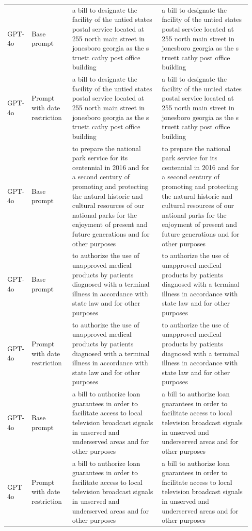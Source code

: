 \begin{longtable}{>{\raggedright\arraybackslash}p{1.4cm}>{\raggedright\arraybackslash}p{1.4cm}>{\raggedright\arraybackslash}p{5.5cm}>{\raggedright\arraybackslash}p{5.5cm}}
GPT-4o & Base prompt & a bill to designate the facility of the untied states postal service located at 255 north main street in jonesboro georgia as the s truett cathy post office building & a bill to designate the facility of the untied states postal service located at 255 north main street in jonesboro georgia as the s truett cathy post office building\\
GPT-4o & Prompt with date restriction & a bill to designate the facility of the untied states postal service located at 255 north main street in jonesboro georgia as the s truett cathy post office building & a bill to designate the facility of the untied states postal service located at 255 north main street in jonesboro georgia as the s truett cathy post office building\\
GPT-4o & Base prompt & to prepare the national park service for its centennial in 2016 and for a second century of promoting and protecting the natural historic and cultural resources of our national parks for the enjoyment of present and future generations and for other purposes & to prepare the national park service for its centennial in 2016 and for a second century of promoting and protecting the natural historic and cultural resources of our national parks for the enjoyment of present and future generations and for other purposes\\
GPT-4o & Base prompt & to authorize the use of unapproved medical products by patients diagnosed with a terminal illness in accordance with state law and for other purposes & to authorize the use of unapproved medical products by patients diagnosed with a terminal illness in accordance with state law and for other purposes\\
GPT-4o & Prompt with date restriction & to authorize the use of unapproved medical products by patients diagnosed with a terminal illness in accordance with state law and for other purposes & to authorize the use of unapproved medical products by patients diagnosed with a terminal illness in accordance with state law and for other purposes\\
GPT-4o & Base prompt & a bill to authorize loan guarantees in order to facilitate access to local television broadcast signals in unserved and underserved areas and for other purposes & a bill to authorize loan guarantees in order to facilitate access to local television broadcast signals in unserved and underserved areas and for other purposes\\
GPT-4o & Prompt with date restriction & a bill to authorize loan guarantees in order to facilitate access to local television broadcast signals in unserved and underserved areas and for other purposes & a bill to authorize loan guarantees in order to facilitate access to local television broadcast signals in unserved and underserved areas and for other purposes\\

\end{longtable}
